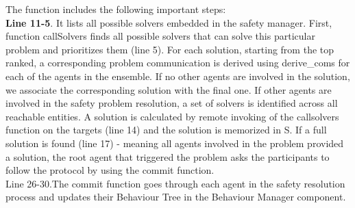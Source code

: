 \documentclass[journal]{IEEEtran}
\theoremstyle{definition}
\newcommand\darko[1]{\nb{Darko}{#1}}
\begin{document}
%				
The function includes the following important steps:\\
\textbf{Line 11-5}. It lists all possible solvers embedded in the safety manager. First, function callSolvers finds all possible solvers that can solve this particular problem and prioritizes them (line 5). 
For each solution, starting from the top ranked, a corresponding problem communication is derived using derive\_coms for each of the agents in the ensemble. If no other agents are involved in the solution, we associate the corresponding solution with the final one.
If other agents are involved in the safety problem resolution, 
a set of solvers is identified across all reachable entities. A solution is calculated by remote invoking of the
callsolvers function on the targets (line 14)
and the solution is memorized in S.
If a full solution is found (line 17) - meaning all agents involved in the problem provided a solution, the root agent that triggered the problem asks the participants to follow the protocol by using the commit function. \\ 
{Line 26-30.}The commit function goes through each agent in the safety resolution process and updates their Behaviour Tree in the Behaviour Manager component.



\darko{END}
\end{document}

